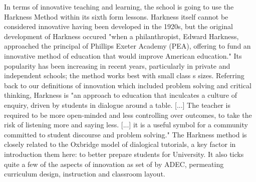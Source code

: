 In terms of innovative teaching and learning, the school is going to use the Harkness Method within its sixth form lessons. Harkness itself cannot be considered innovative having been developed in the 1920s, but the original development of Harkness occured "when a philanthropist, Edward Harkness, approached the principal of Phillips Exeter Academy (PEA), offering to fund an innovative method of education that would improve American education." \cite{Sevigny2016} Its popularity has been increasing in recent years, particularly in private and independent schools; the method works best with small class s sizes. Referring back to our definitions of innovation which included problem solving and critical thinking, Harkness is "an approach to education that inculcates a culture of enquiry, driven by students in dialogue around a table. [...] The teacher is required to be more open-minded and less controlling over outcomes, to take the risk of listening more and saying less. [...] it is a useful symbol for a community committed to student discourse and problem solving." \cite{Williams2010} The Harkness method is closely related to the Oxbridge model of dialogical tutorials, a key factor in introduction them here: to better prepare students for University. It also ticks quite a few of the aspects of innovation as set of by ADEC, permeating curriculum design, instruction and classroom layout. 

